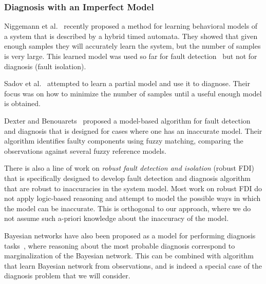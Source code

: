 \documentclass[12pt]{article}
\newcommand{\note}[1]{\textbf{\textit{#1}}}
\begin{document}
\subsubsection{Diagnosis with an Imperfect Model}


Niggemann et al.~\cite{niggemann2012learning} recently proposed a method for learning behavioral models of a system that is described by a hybrid timed automata. They showed that given enough samples they will accurately learn the system, but the number of samples is very large. This learned model was used so far for fault detection~\cite{niggemann2012learning} but not for diagnosis (fault isolation).

Sadov et al.~\cite{sadov2010towards} attempted to learn a partial model and use it to diagnose. Their focus was on how to minimize the number of samples until a useful enough model is obtained. 

Dexter and Benouarets~\cite{dexter1997model} proposed a model-based algorithm for fault detection and diagnosis that is designed for cases where one has an inaccurate model. Their algorithm identifies faulty components using fuzzy matching, comparing the observations against several fuzzy reference models. 

There is also a line of work on {\em robust fault detection and isolation} (robust FDI)~\cite{chen2012robust,frank1997survey} that is specifically designed to develop fault detection and diagnosis algorithm that are robust to inaccuracies in the system model. Most work on robust FDI do not apply logic-based reasoning and attempt to model the possible ways in which the model can be inaccurate. This is orthogonal to our approach, where we do not assume such a-priori knowledge about the inaccuracy of the model.  


Bayesian networks have also been proposed as a model for performing diagnosis tasks~\cite{darwiche2009modeling,el1995diagnosing}, where reasoning about the most probable diagnosis correspond to marginalization of the Bayesian network. This can be combined with algorithm that learn Bayesian network from observations, and is indeed a special case of the diagnosis problem that we will consider. 

\end{document}
